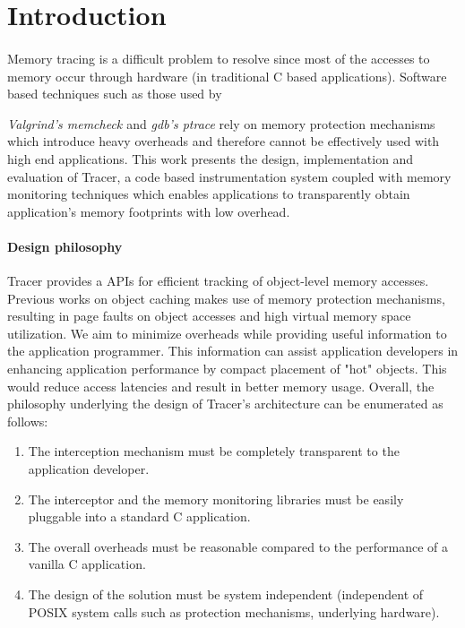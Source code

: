 \section{Introduction} 
\label{sec:intro}
\paragraph{}
Memory tracing is a difficult problem to resolve since most of the accesses to memory occur through hardware (in traditional C based applications). Software based techniques such as those used by {\emph{Valgrind's memcheck \cite{Valgrind}} and {\emph{gdb's ptrace}} rely on memory protection mechanisms which introduce heavy overheads and therefore cannot be effectively used with high end applications. This work presents the design, implementation and evaluation of Tracer, a code based instrumentation system coupled with memory monitoring techniques which enables applications to transparently obtain application's memory footprints with low overhead. 

\paragraph{Design philosophy}
Tracer provides a APIs for efficient tracking of object-level memory accesses. Previous works on object caching makes use of memory protection mechanisms, resulting in page faults on object accesses and high virtual memory space utilization. We aim to minimize overheads while providing useful information to the application programmer. This information can assist application developers in enhancing application performance by compact placement of "hot" objects. This would reduce access latencies and result in better memory usage. Overall, the philosophy underlying the design of Tracer's architecture can be enumerated as follows:
\begin{enumerate}
\item The interception mechanism must be completely transparent to the application developer.
\item The interceptor and the memory monitoring libraries must be easily pluggable into a standard C application.
\item The overall overheads must be reasonable compared to the performance of a vanilla C application.
\item The design of the solution must be system independent (independent of POSIX system calls such as protection mechanisms, underlying hardware).
\end{enumerate}

}
